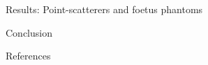 {\begin{block}{Results: Point-scatterers and foetus phantoms}
\end{block}
\vfill


\begin{block}{Conclusion}
	
\end{block}
\vfill


\begin{block}{References}
	\printbibliography
\end{block}
}